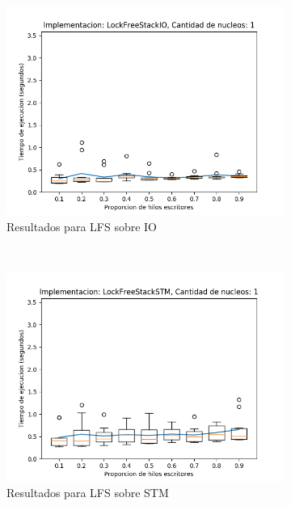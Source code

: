 \begin{appendices}
\begin{figure}[t]
\begin{subfigure}[b]{0.49\textwidth}
        \includegraphics[width=\textwidth]{images/pushPercentages/plots/expLFSIO-1}
        \caption{Resultados para LFS sobre IO}
        \label{subfig:pushPercentages-lfsio-1}
    \end{subfigure}
    ~
    \begin{subfigure}[b]{0.49\textwidth}
        \includegraphics[width=\textwidth]{images/pushPercentages/plots/expLFSSTM-1}
        \caption{Resultados para LFS sobre STM}
        \label{subfig:pushPercentages-lfsstm-1}
    \end{subfigure}
    \begin{subfigure}[b]{0.49\textwidth}

\end{subfigure}
\end{figure}
\end{appendices}
